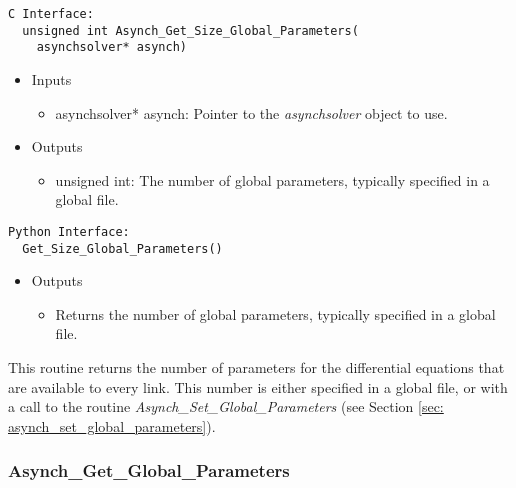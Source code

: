 \documentclass[12pt]{article}
\begin{document}
\begin{lstlisting}[style=CStyle]
  C Interface:
  unsigned int Asynch_Get_Size_Global_Parameters(
	asynchsolver* asynch)
\end{lstlisting}
\begin{itemize}
 \item Inputs
  \begin{itemize}
   \item asynchsolver* asynch: Pointer to the \emph{asynchsolver} object to use.
  \end{itemize}
 \item Outputs
  \begin{itemize}
   \item unsigned int: The number of global parameters, typically specified in a global file.
  \end{itemize}
\end{itemize}
\begin{lstlisting}[style=PythonStyle]
  Python Interface:
  Get_Size_Global_Parameters()
\end{lstlisting}
\begin{itemize}
 \item Outputs
  \begin{itemize}
   \item Returns the number of global parameters, typically specified in a global file.
  \end{itemize}
\end{itemize}
This routine returns the number of parameters for the differential equations that are available to every link. This number is either specified in a global file, or with a call to the routine \emph{Asynch\_Set\_Global\_Parameters} (see Section \ref{sec: asynch_set_global_parameters}).

\subsubsection{Asynch\_Get\_Global\_Parameters} \label{sec: asynch_get_global_parameters}
\end{document}

